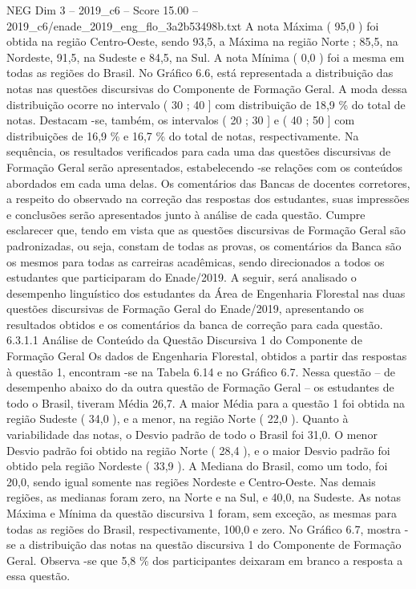 \begin{textsample}{NEG Dim 3 – 2019\_c6 – Score 15.00 – 2019\_c6/enade\_2019\_eng\_flo\_3a2b53498b.txt}
A nota Máxima ( 95,0 ) foi obtida na região Centro-Oeste, sendo 93,5, a Máxima na região Norte ; 85,5, na Nordeste, 91,5, na Sudeste e 84,5, na Sul.
A nota Mínima ( 0,0 ) foi a mesma em todas as regiões do Brasil.
No Gráfico 6.6, está representada a distribuição das notas nas questões discursivas do Componente de Formação Geral.
A moda dessa distribuição ocorre no intervalo ( 30 ; 40 ] com distribuição de 18,9 \% do total de notas.
Destacam -se, também, os intervalos ( 20 ; 30 ] e ( 40 ; 50 ] com distribuições de 16,9 \% e 16,7 \% do total de notas, respectivamente.
Na sequência, os resultados verificados para cada uma das questões discursivas de Formação Geral serão apresentados, estabelecendo -se relações com os conteúdos abordados em cada uma delas.
Os comentários das Bancas de docentes corretores, a respeito do observado na correção das respostas dos estudantes, suas impressões e conclusões serão apresentados junto à análise de cada questão.
Cumpre esclarecer que, tendo em vista que as questões discursivas de Formação Geral são padronizadas, ou seja, constam de todas as provas, os comentários da Banca são os mesmos para todas as carreiras acadêmicas, sendo direcionados a todos os estudantes que participaram do Enade/2019.
A seguir, será analisado o desempenho linguístico dos estudantes da Área de Engenharia Florestal nas duas questões discursivas de Formação Geral do Enade/2019, apresentando os resultados obtidos e os comentários da banca de correção para cada questão. 6.3.1.1 Análise de Conteúdo da Questão Discursiva 1 do Componente de Formação Geral Os dados de Engenharia Florestal, obtidos a partir das respostas à questão 1, encontram -se na Tabela 6.14 e no Gráfico 6.7.
Nessa questão – de desempenho abaixo do da outra questão de Formação Geral – os estudantes de todo o Brasil, tiveram Média 26,7.
A maior Média para a questão 1 foi obtida na região Sudeste ( 34,0 ), e a menor, na região Norte ( 22,0 ).
Quanto à variabilidade das notas, o Desvio padrão de todo o Brasil foi 31,0.
O menor Desvio padrão foi obtido na região Norte ( 28,4 ), e o maior Desvio padrão foi obtido pela região Nordeste ( 33,9 ).
A Mediana do Brasil, como um todo, foi 20,0, sendo igual somente nas regiões Nordeste e Centro-Oeste.
Nas demais regiões, as medianas foram zero, na Norte e na Sul, e 40,0, na Sudeste.
As notas Máxima e Mínima da questão discursiva 1 foram, sem exceção, as mesmas para todas as regiões do Brasil, respectivamente, 100,0 e zero.
No Gráfico 6.7, mostra -se a distribuição das notas na questão discursiva 1 do Componente de Formação Geral.
Observa -se que 5,8 \% dos participantes deixaram em branco a resposta a essa questão.

\end{textsample}
